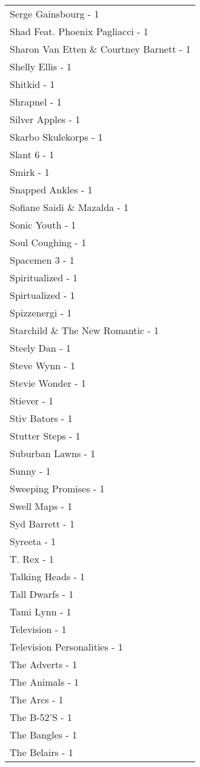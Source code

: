 \documentclass[
]{article}
\begin{document}
\begin{longtable}{l}
Serge Gainsbourg - 1 \\ 
Shad Feat. Phoenix Pagliacci - 1 \\ 
Sharon Van Etten \& Courtney Barnett - 1 \\ 
Shelly Ellis - 1 \\ 
Shitkid - 1 \\ 
Shrapnel - 1 \\ 
Silver Apples - 1 \\ 
Skarbo Skulekorps - 1 \\ 
Slant 6 - 1 \\ 
Smirk - 1 \\ 
Snapped Ankles - 1 \\ 
Sofiane Saidi \& Mazalda - 1 \\ 
Sonic Youth - 1 \\ 
Soul Coughing - 1 \\ 
Spacemen 3 - 1 \\ 
Spiritualized - 1 \\ 
Spirtualized - 1 \\ 
Spizzenergi - 1 \\ 
Starchild \& The New Romantic - 1 \\ 
Steely Dan - 1 \\ 
Steve Wynn - 1 \\ 
Stevie Wonder - 1 \\ 
Stiever - 1 \\ 
Stiv Bators - 1 \\ 
Stutter Steps - 1 \\ 
Suburban Lawns - 1 \\ 
Sunny - 1 \\ 
Sweeping Promises - 1 \\ 
Swell Maps - 1 \\ 
Syd Barrett - 1 \\ 
Syreeta - 1 \\ 
T. Rex - 1 \\ 
Talking Heads - 1 \\ 
Tall Dwarfs - 1 \\ 
Tami Lynn - 1 \\ 
Television - 1 \\ 
Television Personalities - 1 \\ 
The Adverts - 1 \\ 
The Animals - 1 \\ 
The Arcs - 1 \\ 
The B-52'S - 1 \\ 
The Bangles - 1 \\ 
The Belairs - 1 \\ 

\end{longtable}
\end{document}
